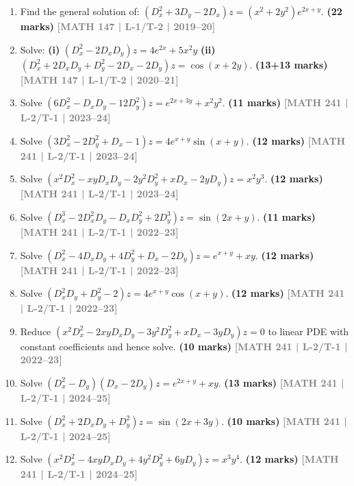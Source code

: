 \documentclass[12pt,a4paper]{article}
\newcommand{\yr}[1]{\hfill\textcolor{gray}{\small\textbf{[#1]}}}
\newcommand{\mk}[1]{\textcolor{orange!70!black}{\small\textbf{(#1 marks)}}}
\begin{document}
\begin{enumerate}
\item Find the general solution of: $(D_{x}^{2}+3D_{y}-2D_{x})z=(x^{2}+2y^{2})e^{2x+y}$.
\mk{22} \yr{MATH 147 | L-1/T-2 | 2019--20}

\item Solve: \textbf{(i)} $(D_{x}^{2}-2D_{x}D_{y})z=4e^{2x}+5x^{2}y$ \quad \textbf{(ii)} $(D_{x}^{2}+2D_{x}D_{y}+D_{y}^{2}-2D_{x}-2D_{y})z=\cos(x+2y)$.
\mk{13+13} \yr{MATH 147 | L-1/T-2 | 2020--21}

\item Solve $(6D_{x}^{2}-D_{x}D_{y}-12D_{y}^{2})z=e^{2x+3y}+x^{2}y^{2}$.
\mk{11} \yr{MATH 241 | L-2/T-1 | 2023--24}

\item Solve $(3D_{x}^{2}-2D_{y}^{2}+D_{x}-1)z=4e^{x+y}\sin(x+y)$.
\mk{12} \yr{MATH 241 | L-2/T-1 | 2023--24}

\item Solve $(x^{2}D_{x}^{2}-xyD_{x}D_{y}-2y^{2}D_{y}^{2}+xD_{x}-2yD_{y})z=x^{2}y^{3}$.
\mk{12} \yr{MATH 241 | L-2/T-1 | 2023--24}

\item Solve $(D_{x}^{3}-2D_{x}^{2}D_{y}-D_{x}D_{y}^{2}+2D_{y}^{3})z=\sin(2x+y)$.
\mk{11} \yr{MATH 241 | L-2/T-1 | 2022--23}

\item Solve $(D_{x}^{2}-4D_{x}D_{y}+4D_{y}^{2}+D_{x}-2D_{y})z=e^{x+y}+xy$.
\mk{12} \yr{MATH 241 | L-2/T-1 | 2022--23}

\item Solve $(D_{x}^{2}D_{y}+D_{y}^{2}-2)z=4e^{x+y}\cos(x+y)$.
\mk{12} \yr{MATH 241 | L-2/T-1 | 2022--23}

\item Reduce $(x^{2}D_{x}^{2}-2xyD_{x}D_{y}-3y^{2}D_{y}^{2}+xD_{x}-3yD_{y})z=0$ to linear PDE with constant coefficients and hence solve.
\mk{10} \yr{MATH 241 | L-2/T-1 | 2022--23}

\item Solve $(D_{x}^{2}-D_{y})(D_{x}-2D_{y})z=e^{2x+y}+xy$.
\mk{13} \yr{MATH 241 | L-2/T-1 | 2024--25}

\item Solve $(D_{x}^{2}+2D_{x}D_{y}+D_{y}^{2})z=\sin(2x+3y)$.
\mk{10} \yr{MATH 241 | L-2/T-1 | 2024--25}

\item Solve $(x^{2}D_{x}^{2}-4xyD_{x}D_{y}+4y^{2}D_{y}^{2}+6yD_{y})z=x^{3}y^{4}$.
\mk{12} \yr{MATH 241 | L-2/T-1 | 2024--25}

\end{enumerate}
\end{document}
